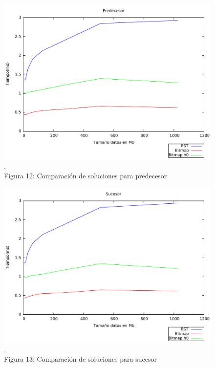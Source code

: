 \documentclass[11pt]{article}
\begin{document}
\begin{center}\begin{figure}[htp]
\centering
\includegraphics[scale=0.45]{exppred.pdf}
\\\scriptsize{\color{white}.\color{black}\\Figura 12: Comparación de soluciones para predecesor}
\label{etiqueta}
\end{figure}
\end{center}
\begin{center}\begin{figure}[htp]
\centering
\includegraphics[scale=0.45]{expsuc.pdf}
\\\scriptsize{\color{white}.\color{black}\\Figura 13: Comparación de soluciones para sucesor}
\label{etiqueta}
\end{figure}
\end{center}
\clearpage
\end{document}
